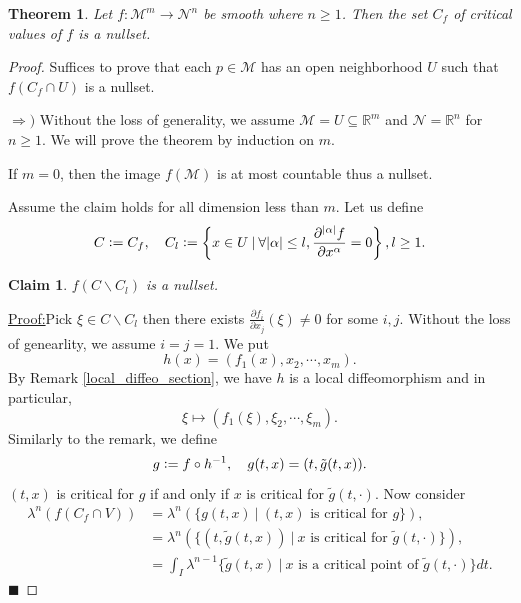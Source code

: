 \documentclass[8pt]{article}
\newtheorem{theorem}{Theorem} [section]
\newtheorem{claim}{Claim}
\newenvironment{claimproof}[1]{\par\noindent\underline{Proof:}\space#1}{\hfill $\blacksquare$}
\newcommand{\defeq}{\vcentcolon=}
\newcommand{\R}[0]{\mathbb{R}}
\newcommand{\M}[0]{\mathcal{M}}
\newcommand{\maniN}[0]{\mathcal{N}}
\newcommand{\sep}[0]{\:|\:}
\newcommand{\pd}[2]{{\frac {\partial #1} {\partial #2}}}
\begin{document}
\setcounter{claim}{0}
\begin{theorem}
  Let $f:\M^m\to\maniN^n$ be smooth where $n\geq 1$. Then the set $C_f$ of critical values of $f$ is a nullset. 
\end{theorem}
\begin{proof}
  Suffices to prove that each $p\in\M$ has an open neighborhood $U$ such that $f(C_f\cap U)$ is a nullset.
  \par$\Rightarrow)$ Without the loss of generality, we assume $\M=U\subseteq\R^m$ and $\maniN=\R^n$ for $n\geq 1$. We will prove the theorem by induction on $m$. 
  \par If $m=0$, then the image $f(\M)$ is at most countable thus a nullset.
  \par Assume the claim holds for all dimension less than $m$. Let us define 
  \begin{equation*}
    C\defeq C_f,\quad C_l\defeq \left\{x\in U\sep\forall \vert\alpha\vert\leq l, {\frac {\partial^{\vert\alpha\vert}f} {\partial x^\alpha}}=0\right\},l\geq 1.
  \end{equation*}
  \begin{claim}
    $f(C\backslash C_l)$ is a nullset.
  \end{claim}
  \begin{claimproof}
    Pick $\xi\in C\backslash C_l$ then there exists $\pd{f_i}{x_j}(\xi) \not=0$ for some $i,j$. Without the loss of genearlity, we assume $i=j=1$.
  We put 
  \begin{equation*}
    h(x) = (f_1(x),x_2,\cdots,x_m).
  \end{equation*}
   By Remark \ref{local_diffeo_section}, we have $h$ is a local diffeomorphism and in particular,
   \begin{equation*}
    \xi\mapsto(f_1(\xi),\xi_2,\cdots,\xi_m).
   \end{equation*}
   Similarly to the remark, we define 
   \begin{equation*}
    g\defeq f\circ h^{-1},\quad g(t,x) = (t,\tilde{g}(t,x)).
   \end{equation*}
   $(t,x)$ is critical for $g$ if and only if $x$ is critical for $\tilde{g}(t,\cdot)$. Now consider 
   \begin{align*}
    \lambda^n(f(C_f\cap V)) & = \lambda^n(\{g(t,x)\sep\text{$(t,x)$ is critical for $g$}\}),\\
    & = \lambda^n(\{(t,\tilde{g}(t,x))\sep\text{$x$ is critical for $\tilde{g}(t,\cdot)$}\}),\\
    & = \int_I \lambda^{n-1}\{\tilde{g}(t,x)\sep\text{$x$ is a critical point of $\tilde{g}(t,\cdot)$}\}dt.

\end{align*}
\end{claimproof}
\end{proof}
\end{document}
